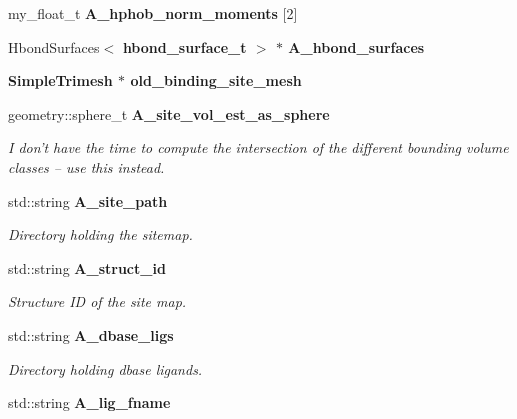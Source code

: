 \begin{CompactItemize}
\item 
my\_\-float\_\-t \textbf{A\_\-hphob\_\-norm\_\-moments} [2]\label{classSimSite3D_1_1Sitemap_710b85700b6359566aa94d1cb3b23ad0}

\item 
Hbond\-Surfaces$<$ \bf{hbond\_\-surface\_\-t} $>$ $\ast$ \textbf{A\_\-hbond\_\-surfaces}\label{classSimSite3D_1_1Sitemap_746f37a116532d40ebfb917405f79f56}

\item 
\bf{Simple\-Trimesh} $\ast$ \textbf{old\_\-binding\_\-site\_\-mesh}\label{classSimSite3D_1_1Sitemap_67d0c9dd4ca44665912f7927effd2478}

\item 
geometry::sphere\_\-t \bf{A\_\-site\_\-vol\_\-est\_\-as\_\-sphere}\label{classSimSite3D_1_1Sitemap_d868aaadd592ee46383e0ab2e9cc9350}

\begin{CompactList}\small\item\em I don't have the time to compute the intersection of the different bounding volume classes -- use this instead. \item\end{CompactList}\item 
std::string \bf{A\_\-site\_\-path}\label{classSimSite3D_1_1Sitemap_f9703909778c885c912a1415910f988f}

\begin{CompactList}\small\item\em Directory holding the sitemap. \item\end{CompactList}\item 
std::string \bf{A\_\-struct\_\-id}\label{classSimSite3D_1_1Sitemap_1355b26f18d6bd22405fc2ed95543b68}

\begin{CompactList}\small\item\em Structure ID of the site map. \item\end{CompactList}\item 
std::string \bf{A\_\-dbase\_\-ligs}\label{classSimSite3D_1_1Sitemap_f759f963ef40e2d5b8bfe0805f70e2f8}

\begin{CompactList}\small\item\em Directory holding dbase ligands. \item\end{CompactList}\item 
std::string \bf{A\_\-lig\_\-fname}\label{classSimSite3D_1_1Sitemap_8687cc1a0a4f3c900d40bc3b3ba7b4bb}


\end{CompactItemize}
